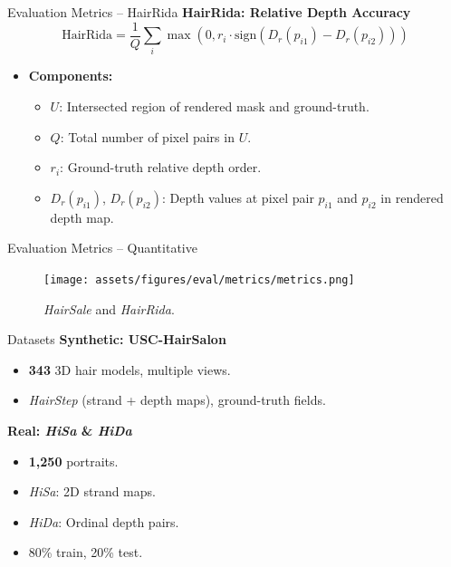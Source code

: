 \begin{frame}[t]{Evaluation Metrics -- HairRida}
    \textbf{HairRida: Relative Depth Accuracy}
    \begin{equation*}
        \text{HairRida} = \frac{1}{Q} \sum_{i} \max(0, r_i \cdot \text{sign}(D_r(p_{i1}) - D_r(p_{i2})))
    \end{equation*}
    \begin{itemize}
        \item \textbf{Components:}
        \begin{itemize}
            \item \(U\): Intersected region of rendered mask and ground-truth.
            \item \(Q\): Total number of pixel pairs in \(U\).
            \item \(r_i\): Ground-truth relative depth order.
            \item \(D_r(p_{i1})\), \(D_r(p_{i2})\): Depth values at pixel pair \(p_{i1}\) and \(p_{i2}\) in rendered depth map.
        \end{itemize}
    \end{itemize}
\end{frame}

\begin{frame}[t]{Evaluation Metrics -- Quantitative}
    \begin{figure}
        \centering
        \texttt{[image: assets/figures/eval/metrics/metrics.png]}
        \caption{\textit{HairSale} and \textit{HairRida}.}
    \end{figure}
\end{frame}

\begin{frame}[t]{Datasets}
    \textbf{Synthetic: USC-HairSalon\cite{Hu2015SingleviewHM}}
    \begin{itemize}
        \item \textbf{343} 3D hair models, multiple views.
        \item \emph{HairStep} (strand + depth maps), ground-truth fields.
    \end{itemize}
    \vspace{5pt}
    \textbf{Real: \emph{HiSa} \& \emph{HiDa}}
    \begin{itemize}
        \item \textbf{1,250} portraits.
        \item \emph{HiSa}: 2D strand maps.
        \item \emph{HiDa}: Ordinal depth pairs.
        \item 80\% train, 20\% test.
    \end{itemize}
\end{frame}



